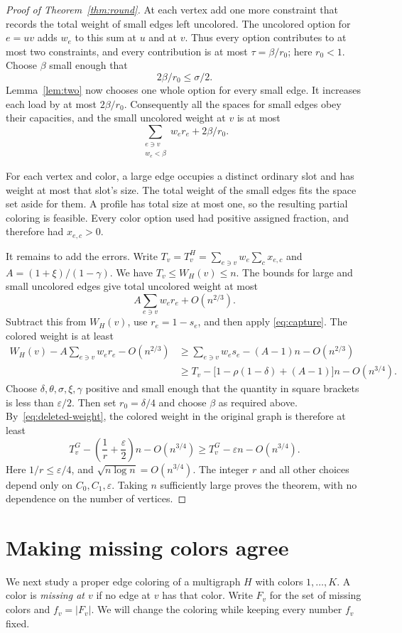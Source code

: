 \documentclass[11pt]{article}
\theoremstyle{definition}\newtheorem{algorithm}{Algorithm}[section]
\numberwithin{equation}{section}
\theoremstyle{remark}\newtheorem*{remark}{Remark}
\newcommand{\eps}{\varepsilon}
\begin{document}
\begin{proof}[Proof of Theorem~\ref{thm:round}]
At each vertex add one more constraint that records the total weight of
small edges left uncolored. The uncolored option for $e=uv$ adds $w_e$
to this sum at $u$ and at $v$. Thus every option contributes to at most
two constraints, and every contribution is at most
$\tau=\beta/r_0$; here $r_0<1$.
Choose $\beta$ small enough that
\[
 2\beta/r_0\le\sigma/2.
\]
Lemma~\ref{lem:two} now chooses one whole option for every small edge.
It increases each load by at most $2\beta/r_0$.
Consequently all the spaces for small edges obey their capacities, and
the small uncolored weight at $v$ is at most
\[
 \sum_{\substack{e\ni v\\w_e<\beta}}w_er_e+2\beta/r_0.
\]

For each vertex and color, a large edge occupies a distinct ordinary
slot and has weight at most that slot's size. The total weight of the
small edges fits the space set aside for them. A profile has
total size at most one, so the resulting partial coloring is feasible.
Every color option used had positive assigned fraction, and therefore
had $x_{e,c}>0$.

It remains to add the errors. Write
$T_v=T_v^H=\sum_{e\ni v}w_e\sum_cx_{e,c}$ and
$A=(1+\xi)/(1-\gamma)$. We have $T_v\le W_H(v)\le n$.
The bounds for large and small uncolored edges give total uncolored
weight at most
\[
 A\sum_{e\ni v}w_er_e+O(n^{2/3}).
\]
Subtract this from $W_H(v)$, use $r_e=1-s_e$, and then apply
\eqref{eq:capture}. The colored weight is at least
\[
 \begin{split}
 W_H(v)-A\sum_{e\ni v}w_er_e-O(n^{2/3})
 &\ge \sum_{e\ni v}w_es_e-(A-1)n-O(n^{2/3})\\
 &\ge T_v-\bigl[1-\rho(1-\delta)+(A-1)\bigr]n
                 -O(n^{3/4}).
 \end{split}
\]
Choose $\delta,\theta,\sigma,\xi,\gamma$ positive and small enough that
the quantity in square brackets is less than $\eps/2$.
Then set $r_0=\delta/4$ and choose $\beta$ as required above.
By~\eqref{eq:deleted-weight}, the colored weight in the original graph
is therefore at least
\[
 T_v^G-\left(\frac1r+\frac\eps2\right)n-O(n^{3/4})
 \ge T_v^G-\eps n-O(n^{3/4}).
\]
Here $1/r\le\eps/4$, and $\sqrt{n\log n}=O(n^{3/4})$.
The integer $r$ and all other choices depend only on $C_0,C_1,\eps$.
Taking $n$ sufficiently large proves the theorem, with no dependence
on the number of vertices.
\end{proof}

\section{Making missing colors agree}\label{sec:mix-proof}
We next study a proper edge coloring of a multigraph $H$ with
colors $1,\ldots,K$. A color is \emph{missing at $v$} if no edge at $v$
has that color. Write $F_v$ for the set of missing colors and $f_v=|F_v|$.
We will change the coloring while keeping every number $f_v$ fixed.
\end{document}
